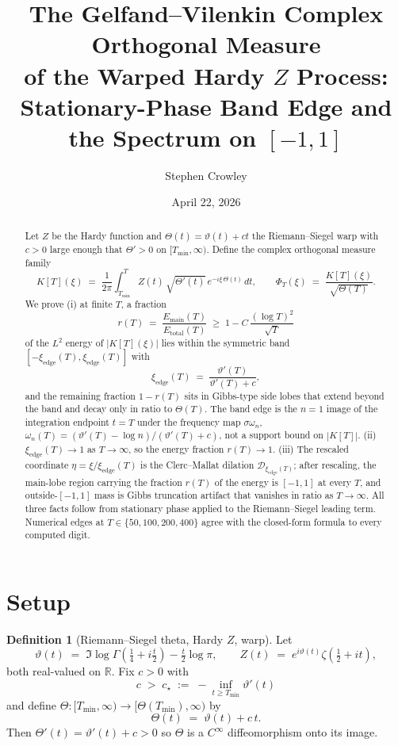 \documentclass[11pt,a4paper]{article}
\title{The Gelfand--Vilenkin Complex Orthogonal Measure\\
of the Warped Hardy $Z$ Process:\\
Stationary-Phase Band Edge and the Spectrum on $[-1,1]$}
\author{Stephen Crowley}
\date{April 22, 2026}
\theoremstyle{plain}
\theoremstyle{definition}
\newtheorem{definition}[theorem]{Definition}
\newcommand{\R}{\mathbb{R}}
\begin{document}
\maketitle

\begin{abstract}
Let $Z$ be the Hardy function and $\Theta(t)=\vartheta(t)+ct$ the Riemann--Siegel warp with $c>0$ large enough that $\Theta'>0$ on $[T_{\min},\infty)$. Define the complex orthogonal measure family
\[
K[T](\xi) \;=\; \frac{1}{2\pi}\int_{T_{\min}}^{T} Z(t)\,\sqrt{\Theta'(t)}\,e^{-i\xi\,\Theta(t)}\,dt,\qquad
\Phi_T(\xi)\;=\;\frac{K[T](\xi)}{\sqrt{\Theta(T)}}.
\]
We prove (i) at finite $T$, a fraction
\[
r(T) \;=\; \frac{E_{\mathrm{main}}(T)}{E_{\mathrm{total}}(T)} \;\ge\; 1 - C\,\frac{(\log T)^2}{\sqrt{T}}
\]
of the $L^2$ energy of $|K[T](\xi)|$ lies within the symmetric band $[-\xi_{\mathrm{edge}}(T),\xi_{\mathrm{edge}}(T)]$ with
\[
\xi_{\mathrm{edge}}(T) \;=\; \frac{\vartheta'(T)}{\vartheta'(T)+c},
\]
and the remaining fraction $1-r(T)$ sits in Gibbs-type side lobes that extend beyond the band and decay only in ratio to $\Theta(T)$. The band edge is the $n=1$ image of the integration endpoint $t=T$ under the frequency map $\sigma\omega_n$, $\omega_n(T)=(\vartheta'(T)-\log n)/(\vartheta'(T)+c)$, not a support bound on $|K[T]|$. (ii) $\xi_{\mathrm{edge}}(T)\to 1$ as $T\to\infty$, so the energy fraction $r(T)\to 1$. (iii) The rescaled coordinate $\eta=\xi/\xi_{\mathrm{edge}}(T)$ is the Clerc--Mallat dilation $\mathcal{D}_{\xi_{\mathrm{edge}}(T)}$; after rescaling, the main-lobe region carrying the fraction $r(T)$ of the energy is $[-1,1]$ at every $T$, and outside-$[-1,1]$ mass is Gibbs truncation artifact that vanishes in ratio as $T\to\infty$. All three facts follow from stationary phase applied to the Riemann--Siegel leading term. Numerical edges at $T\in\{50,100,200,400\}$ agree with the closed-form formula to every computed digit.
\end{abstract}

\section{Setup}

\begin{definition}[Riemann--Siegel theta, Hardy $Z$, warp]\label{def:base}
Let
\[
\vartheta(t) \;=\; \Im\log\Gamma\!\left(\tfrac14+i\tfrac{t}{2}\right) - \tfrac{t}{2}\log\pi,
\qquad
Z(t) \;=\; e^{i\vartheta(t)}\zeta\!\left(\tfrac12+it\right),
\]
both real-valued on $\R$. Fix $c>0$ with
\[
c \;>\; c_\star \;:=\; -\inf_{t\ge T_{\min}}\vartheta'(t)
\]
and define $\Theta:[T_{\min},\infty)\to[\Theta(T_{\min}),\infty)$ by
\[
\Theta(t) \;=\; \vartheta(t) + c\,t .
\]
Then $\Theta'(t)=\vartheta'(t)+c>0$ so $\Theta$ is a $C^\infty$ diffeomorphism onto its image.
\end{definition}
\end{document}
